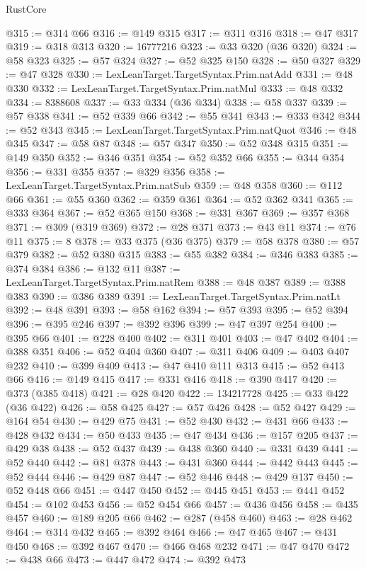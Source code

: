 \begin{lexlean}{RustCore}
\begin{coremodule}
@315 := @314 @66
@316 := @149 @315
@317 := @311 @316
@318 := @47 @317
@319 := @318 @313
@320 := 16777216
@323 := @33 @320 (@36 @320)
@324 := @58 @323
@325 := @57 @324
@327 := @52 @325 @150
@328 := @50 @327
@329 := @47 @328
@330 := LexLeanTarget.TargetSyntax.Prim.natAdd
@331 := @48 @330
@332 := LexLeanTarget.TargetSyntax.Prim.natMul
@333 := @48 @332
@334 := 8388608
@337 := @33 @334 (@36 @334)
@338 := @58 @337
@339 := @57 @338
@341 := @52 @339 @66
@342 := @55 @341
@343 := @333 @342
@344 := @52 @343
@345 := LexLeanTarget.TargetSyntax.Prim.natQuot
@346 := @48 @345
@347 := @58 @87
@348 := @57 @347
@350 := @52 @348 @315
@351 := @149 @350
@352 := @346 @351
@354 := @52 @352 @66
@355 := @344 @354
@356 := @331 @355
@357 := @329 @356
@358 := LexLeanTarget.TargetSyntax.Prim.natSub
@359 := @48 @358
@360 := @112 @66
@361 := @55 @360
@362 := @359 @361
@364 := @52 @362 @341
@365 := @333 @364
@367 := @52 @365 @150
@368 := @331 @367
@369 := @357 @368
@371 := @309 (@319 @369)
@372 := @28 @371
@373 := @43 @11
@374 := @76 @11
@375 := 8
@378 := @33 @375 (@36 @375)
@379 := @58 @378
@380 := @57 @379
@382 := @52 @380 @315
@383 := @55 @382
@384 := @346 @383
@385 := @374 @384
@386 := @132 @11
@387 := LexLeanTarget.TargetSyntax.Prim.natRem
@388 := @48 @387
@389 := @388 @383
@390 := @386 @389
@391 := LexLeanTarget.TargetSyntax.Prim.natLt
@392 := @48 @391
@393 := @58 @162
@394 := @57 @393
@395 := @52 @394
@396 := @395 @246
@397 := @392 @396
@399 := @47 @397 @254
@400 := @395 @66
@401 := @228 @400
@402 := @311 @401
@403 := @47 @402
@404 := @388 @351
@406 := @52 @404 @360
@407 := @311 @406
@409 := @403 @407 @232
@410 := @399 @409
@413 := @47 @410 @111 @313
@415 := @52 @413 @66
@416 := @149 @415
@417 := @331 @416
@418 := @390 @417
@420 := @373 (@385 @418)
@421 := @28 @420
@422 := 134217728
@425 := @33 @422 (@36 @422)
@426 := @58 @425
@427 := @57 @426
@428 := @52 @427
@429 := @164 @54
@430 := @429 @75
@431 := @52 @430
@432 := @431 @66
@433 := @428 @432
@434 := @50 @433
@435 := @47 @434
@436 := @157 @205
@437 := @429 @38
@438 := @52 @437
@439 := @438 @360
@440 := @331 @439
@441 := @52 @440
@442 := @81 @378
@443 := @431 @360
@444 := @442 @443
@445 := @52 @444
@446 := @429 @87
@447 := @52 @446
@448 := @429 @137
@450 := @52 @448 @66
@451 := @447 @450
@452 := @445 @451
@453 := @441 @452
@454 := @102 @453
@456 := @52 @454 @66
@457 := @436 @456
@458 := @435 @457
@460 := @189 @205 @66
@462 := @287 (@458 @460)
@463 := @28 @462
@464 := @314 @432
@465 := @392 @464
@466 := @47 @465
@467 := @431 @450
@468 := @392 @467
@470 := @466 @468 @232
@471 := @47 @470
@472 := @438 @66
@473 := @447 @472
@474 := @392 @473

\end{coremodule}
\end{lexlean}
